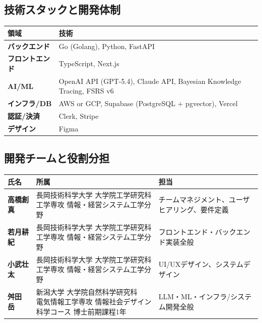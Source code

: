 \documentclass[paper=a4,fontsize=10.5bp,jafontsize=10.5bp,twocolumn]{jlreq}
\begin{document}
\subsection{技術スタックと開発体制}

\begin{scriptsize}\noindent
\begin{tabularx}{\linewidth}{>{\bfseries}l X}
\toprule
領域 & 技術 \\
\midrule
バックエンド & Go (Golang), Python, FastAPI \\
フロントエンド & TypeScript, Next.js \\
AI/ML & OpenAI API (GPT-5.4), Claude API, Bayesian Knowledge Tracing, FSRS v6 \\
インフラ/DB & AWS or GCP, Supabase (PostgreSQL + pgvector), Vercel \\
認証/決済 & Clerk, Stripe \\
デザイン & Figma \\
\bottomrule
\end{tabularx}
\end{scriptsize}

\subsection{開発チームと役割分担}

\begin{scriptsize}\noindent
\begin{tabularx}{\linewidth}{>{\bfseries}l l X}
\toprule
氏名 & 所属 & 担当 \\
\midrule
高橋創真 & \parbox[t]{3.2cm}{長岡技術科学大学 大学院工学研究科\\工学専攻 情報・経営システム工学分野} & チームマネジメント、ユーザヒアリング、要件定義 \\[4pt]
若月耕紀 & \parbox[t]{3.2cm}{長岡技術科学大学 大学院工学研究科\\工学専攻 情報・経営システム工学分野} & フロントエンド・バックエンド実装全般 \\[4pt]
小武壮太 & \parbox[t]{3.2cm}{長岡技術科学大学 大学院工学研究科\\工学専攻 情報・経営システム工学分野} & UI/UXデザイン、システムデザイン \\[4pt]
舛田　岳 & \parbox[t]{3.2cm}{新潟大学 大学院自然科学研究科\\電気情報工学専攻 情報社会デザイン科学コース 博士前期課程1年} & LLM・ML・インフラ/システム開発全般 \\
\bottomrule
\end{tabularx}
\end{scriptsize}
\end{document}

